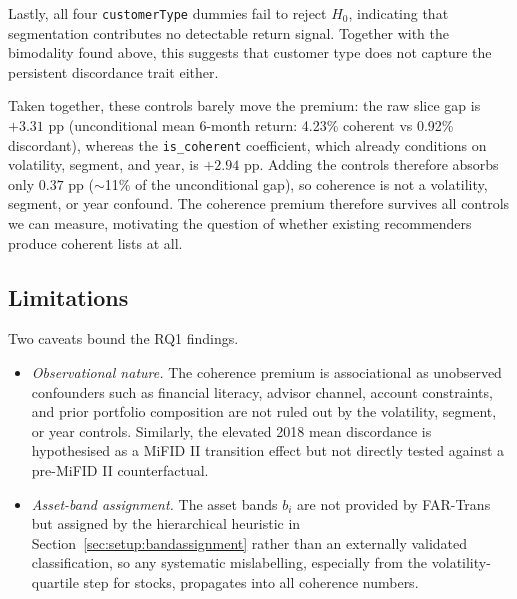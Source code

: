 Lastly, all four \texttt{customerType} dummies fail to reject $H_0$, indicating that segmentation contributes no detectable return signal. Together with the bimodality found above, this suggests that customer type does not capture the persistent discordance trait either.

Taken together, these controls barely move the premium: the raw slice gap is $+3.31$ pp (unconditional mean 6-month return: 4.23\% coherent vs 0.92\% discordant), whereas the \texttt{is\_coherent} coefficient, which already conditions on volatility, segment, and year, is $+2.94$ pp. Adding the controls therefore absorbs only $0.37$ pp ($\sim$11\% of the unconditional gap), so coherence is not a volatility, segment, or year confound. The coherence premium therefore survives all controls we can measure, motivating the question of whether existing recommenders produce coherent lists at all.

\subsection{Limitations}
\label{sec:rq1:limitations}

Two caveats bound the RQ1 findings.

\begin{itemize}
    \item \textit{Observational nature.} The coherence premium is associational as unobserved confounders such as financial literacy, advisor channel, account constraints, and prior portfolio composition are not ruled out by the volatility, segment, or year controls. Similarly, the elevated 2018 mean discordance is hypothesised as a MiFID II transition effect but not directly tested against a pre-MiFID II counterfactual.
    \item \textit{Asset-band assignment.} The asset bands $b_i$ are not provided by FAR-Trans but assigned by the hierarchical heuristic in Section~\ref{sec:setup:bandassignment} rather than an externally validated classification, so any systematic mislabelling, especially from the volatility-quartile step for stocks, propagates into all coherence numbers.
\end{itemize}
